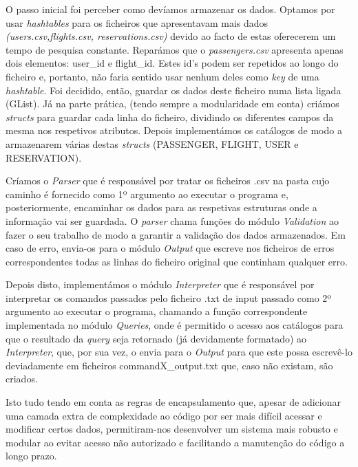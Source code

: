 \documentclass[12pt,a4paper]{report}
\begin{document}
    
    O passo inicial foi perceber como devíamos armazenar os dados. Optamos por usar \textit{hashtables} para os ficheiros que apresentavam mais dados \textit{(users.csv,flights.csv, reservations.csv)} devido ao facto de estas oferecerem um tempo de pesquisa constante. Reparámos que o \textit{passengers.csv} apresenta apenas dois elementos: user\_id e flight\_id. Estes id's podem ser repetidos ao longo do ficheiro e, portanto, não faria sentido usar nenhum deles como \textit{key} de uma \textit{hashtable}. Foi decidido, então, guardar os dados deste ficheiro numa lista ligada (GList). 
    Já na parte prática, (tendo sempre a modularidade em conta) criámos \textit{structs} para guardar cada linha do ficheiro, dividindo os diferentes campos da mesma nos respetivos atributos. Depois implementámos os catálogos de modo a armazenarem várias destas \textit{structs} (PASSENGER, FLIGHT, USER e RESERVATION).  

    Críamos o \textit{Parser} que é responsável por tratar os ficheiros .csv na pasta cujo caminho é fornecido como 1º argumento ao executar o programa e, posteriormente, encaminhar os dados para as respetivas estruturas onde a informação vai ser guardada. O \textit{parser} chama funções do módulo \textit{Validation} ao fazer o seu trabalho de modo a garantir a validação dos dados armazenados. Em caso de erro, envia-os para o módulo \textit{Output} que escreve nos ficheiros de erros correspondentes todas as linhas do ficheiro original que continham qualquer erro.

    Depois disto, implementámos o módulo \textit{Interpreter} que é responsável por interpretar os comandos passados pelo ficheiro .txt de input passado como 2º argumento ao executar o programa, chamando a função correspondente implementada no módulo \textit{Queries}, onde é permitido o acesso aos catálogos para que o resultado da \textit{query} seja retornado (já devidamente formatado) ao \textit{Interpreter}, que, por sua vez, o envia para o \textit{Output} para que este possa escrevê-lo deviadamente em ficheiros commandX\_output.txt que, caso não existam, são criados.

    Isto tudo tendo em conta as regras de encapsulamento que, apesar de adicionar uma camada extra de complexidade ao código por ser mais difícil acessar e modificar certos dados, permitiram-nos desenvolver um sistema mais robusto e modular ao evitar acesso não autorizado e facilitando a manutenção do código a longo prazo.

    
\end{document}
